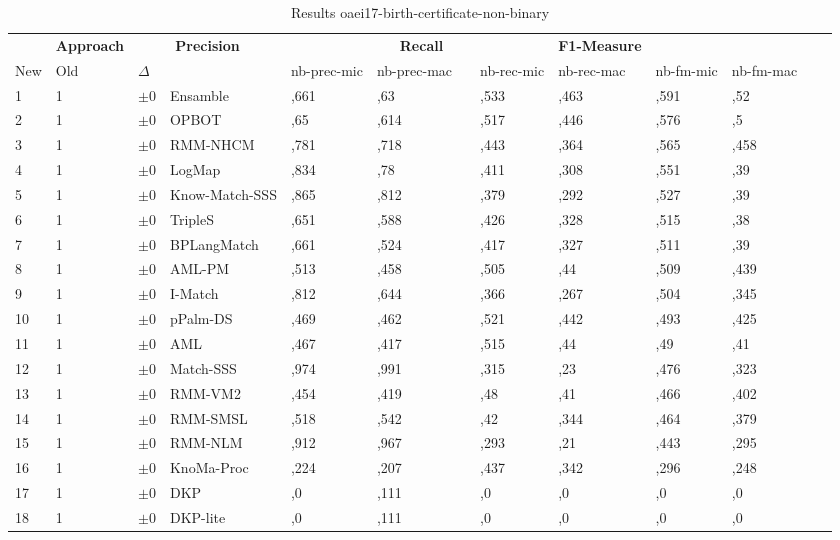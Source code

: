 \begin{table}[htb]
\setlength{\tabcolsep}{0.5em}
\centering
\scriptsize
\begin{tabular}[tb]{lllp{2.3cm}llllllllll}
\noalign{\smallskip}\hline\noalign{\smallskip}
\multicolumn{3}{c}{\textbf{Rank}}& \textbf{Approach}  & \multicolumn{2}{c}{\textbf{Precision}}  & \hspace*{1mm}  & \multicolumn{2}{c}{\textbf{Recall}}  & \hspace*{1mm}  & \multicolumn{2}{c}{\textbf{F1-Measure}}  & \hspace*{1mm} \\
New & Old & $\Delta$ & &nb-prec-mic & nb-prec-mac && nb-rec-mic & nb-rec-mac && nb-fm-mic & nb-fm-mac\\
\noalign{\smallskip}\hline\noalign{\smallskip}
1 & 1 		& $\pm$0 &Ensamble    	&	,661 & ,63 & & ,533 & ,463 & & ,591 & ,52\\
2 & 1 		& $\pm$0 &OPBOT    	&	,65 & ,614 & & ,517 & ,446 & & ,576 & ,5\\
3 & 1 		& $\pm$0 &RMM-NHCM    	&	,781 & ,718 & & ,443 & ,364 & & ,565 & ,458\\
4 & 1 		& $\pm$0 &LogMap    	&	,834 & ,78 & & ,411 & ,308 & & ,551 & ,39\\
5 & 1 		& $\pm$0 &Know-Match-SSS    	&	,865 & ,812 & & ,379 & ,292 & & ,527 & ,39\\
6 & 1 		& $\pm$0 &TripleS    	&	,651 & ,588 & & ,426 & ,328 & & ,515 & ,38\\
7 & 1 		& $\pm$0 &BPLangMatch    	&	,661 & ,524 & & ,417 & ,327 & & ,511 & ,39\\
8 & 1 		& $\pm$0 &AML-PM    	&	,513 & ,458 & & ,505 & ,44 & & ,509 & ,439\\
9 & 1 		& $\pm$0 &I-Match    	&	,812 & ,644 & & ,366 & ,267 & & ,504 & ,345\\
10 & 1 		& $\pm$0 &pPalm-DS    	&	,469 & ,462 & & ,521 & ,442 & & ,493 & ,425\\
11 & 1 		& $\pm$0 &AML    	&	,467 & ,417 & & ,515 & ,44 & & ,49 & ,41\\
12 & 1 		& $\pm$0 &Match-SSS    	&	,974 & ,991 & & ,315 & ,23 & & ,476 & ,323\\
13 & 1 		& $\pm$0 &RMM-VM2    	&	,454 & ,419 & & ,48 & ,41 & & ,466 & ,402\\
14 & 1 		& $\pm$0 &RMM-SMSL    	&	,518 & ,542 & & ,42 & ,344 & & ,464 & ,379\\
15 & 1 		& $\pm$0 &RMM-NLM    	&	,912 & ,967 & & ,293 & ,21 & & ,443 & ,295\\
16 & 1 		& $\pm$0 &KnoMa-Proc    	&	,224 & ,207 & & ,437 & ,342 & & ,296 & ,248\\
17 & 1 		& $\pm$0 &DKP    	&	,0 & ,111 & & ,0 & ,0 & & ,0 & ,0\\
18 & 1 		& $\pm$0 &DKP-lite    	&	,0 & ,111 & & ,0 & ,0 & & ,0 & ,0\\
\end{tabular}
\caption{Results oaei17-birth-certificate-non-binary}
\label{tbl:results}
\end{table}